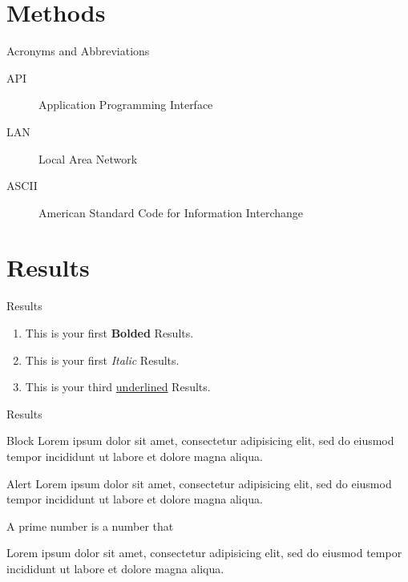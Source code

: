 \documentclass[10pt]{beamer}
\begin{document}
    \section{Methods}
    \begin{frame}{Acronyms and Abbreviations}
        \begin{description}
            \item[API] Application Programming Interface
            \item[LAN] Local Area Network
            \item[ASCII] American Standard Code for Information Interchange
        \end{description}
    \end{frame}


    \section{Results}
    \begin{frame}{Results}
        \begin{enumerate}
            \item This is your first \textbf{Bolded} Results.
            \item This is your first \textit{Italic} Results.
            \item This is your third \underline{underlined} Results.

        \end{enumerate}
    \end{frame}
    \begin{frame}{Results}

        \begin{block}{Block }
            Lorem ipsum dolor sit amet, consectetur adipisicing elit,
            sed do eiusmod tempor incididunt ut labore et
            dolore magna aliqua.
        \end{block}

        \begin{alertblock}{Alert}
            Lorem ipsum dolor sit amet, consectetur adipisicing elit,
            sed do eiusmod tempor incididunt ut labore et
            dolore magna aliqua.
        \end{alertblock}

        \begin{definition}
            A prime number is a number that
        \end{definition}

        \begin{example}
            Lorem ipsum dolor sit amet, consectetur adipisicing elit,
            sed do eiusmod tempor incididunt ut labore et
            dolore magna aliqua.
        \end{example}

    \end{frame}
\end{document}
